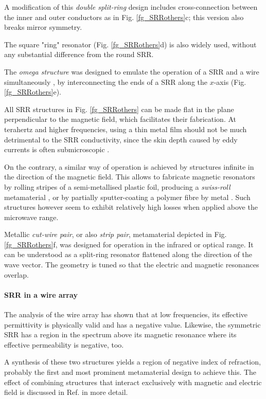 A modification of this \textit{double split-ring} design includes cross-connection between the inner and outer conductors as in Fig. \ref{fg_SRRothers}c; this version also breaks mirror symmetry. 

The square "ring" resonator (Fig. \ref{fg_SRRothers}d) is also widely used, without any substantial difference from the round SRR.

The \textit{omega structure} was designed to emulate the operation of a SRR and a wire simultaneously \cite[pp. 62--72]{croenne2009controle}, by interconnecting the ends of a SRR along the $x$-axis (Fig. \ref{fg_SRRothers}e).

All SRR structures in Fig. \ref{fg_SRRothers} can be made flat in the plane perpendicular to the magnetic field, which facilitates their fabrication. At terahertz and higher frequencies, using a thin metal film should not be much detrimental to the SRR conductivity, since the skin depth caused by eddy currents is often submicroscopic \cite{gibbons2010scalable}.

On the contrary, a similar way of operation is achieved by structures infinite in the direction of the magnetic field. This allows to fabricate magnetic resonators by rolling stripes of a semi-metallised plastic foil, producing a \textit{swiss-roll} metamaterial \cite{gibbons2010scalable}, or by partially sputter-coating a polymer fibre by metal \cite{wang2011fiber}. Such structures however seem to exhibit relatively high losses when applied above the microwave range.

Metallic \textit{cut-wire pair}, or also \textit{strip pair}, metamaterial depicted in Fig. \ref{fg_SRRothers}f, was designed for operation in the infrared or optical range. It can be understood as a split-ring resonator flattened along the direction of the wave vector. The geometry is tuned so that the electric and magnetic resonances overlap.	

\paragraph{SRR in a wire array} %
The analysis of the wire array has shown that at low frequencies, its effective permittivity is physically valid and has a negative value. Likewise, the symmetric SRR has a region in the spectrum above its magnetic resonance where its effective permeability is negative, too.

A synthesis of these two structures yields a region of negative index of refraction, probably the first \cite{pendry2000negative} and most prominent metamaterial design to achieve this. The effect of combining structures that interact exclusively with magnetic and electric field is discussed in Ref. \cite{koschny2004effective} in more detail.

